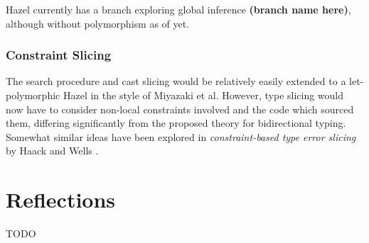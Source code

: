 Hazel currently has a branch exploring global inference \textbf{(branch name here)}, although without polymorphism as of yet.

\subsubsection{Constraint Slicing}
The search procedure and cast slicing would be relatively easily extended to a let-polymorphic Hazel in the style of Miyazaki et al. However, type slicing would now have to consider non-local constraints involved and the code which sourced them, differing significantly from the proposed theory for bidirectional typing. Somewhat similar ideas have been explored in \textit{constraint-based type error slicing} by Haack and Wells \cite{HaackErrSlice}.

\section{Reflections}
TODO